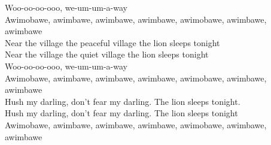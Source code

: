 \documentclass{novel}
\begin{document}
Woo-oo-oo-ooo, we-um-um-a-way\\
Awimobawe, awimbawe, awimbawe, awimbawe, awimobawe, awimbawe, awimbawe \\

Near the village the peaceful village the lion sleeps tonight\\
Near the village the quiet village the lion sleeps tonight \\

Woo-oo-oo-ooo, we-um-um-a-way\\
Awimobawe, awimbawe, awimbawe, awimbawe, awimobawe, awimbawe, awimbawe \\

Hush my darling, don't fear my darling. The lion sleeps tonight.\\
Hush my darling, don't fear my darling. The lion sleeps tonight\\

Awimobawe, awimbawe, awimbawe, awimbawe, awimobawe, awimbawe, awimbawe
\end{document}
